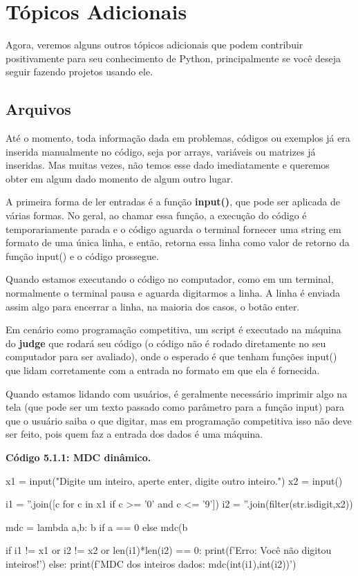 \documentclass[11pt, a4paper]{article}
\begin{document}
\newpage

\section{Tópicos Adicionais}

Agora, veremos alguns outros tópicos adicionais que podem contribuir positivamente para seu conhecimento de Python, principalmente se você deseja seguir fazendo projetos usando ele.

\subsection{Arquivos}

Até o momento, toda informação dada em problemas, códigos ou exemplos já era inserida manualmente no código, seja por arrays, variáveis ou matrizes já inseridas. Mas muitas vezes, não temos esse dado imediatamente e queremos obter em algum dado momento de algum outro lugar.

A primeira forma de ler entradas é a função \textbf{input()}, que pode ser aplicada de várias formas. No geral, ao chamar essa função, a execução do código é temporariamente parada e o código aguarda o terminal fornecer uma string em formato de uma única linha, e então, retorna essa linha como valor de retorno da função input() e o código prossegue.

Quando estamos executando o código no computador, como em um terminal, normalmente o terminal pausa e aguarda digitarmos a linha. A linha é enviada assim algo para encerrar a linha, na maioria dos casos, o botão enter.

Em cenário como programação competitiva, um script é executado na máquina do \textbf{judge} que rodará seu código (o código não é rodado diretamente no seu computador para ser avaliado), onde o esperado é que tenham funções input() que lidam corretamente com a entrada no formato em que ela é fornecida. 

Quando estamos lidando com usuários, é geralmente necessário imprimir algo na tela (que pode ser um texto passado como parâmetro para a função input) para que o usuário saiba o que digitar, mas em programação competitiva isso não deve ser feito, pois quem faz a entrada dos dados é uma máquina.

\textbf{Código 5.1.1: MDC dinâmico.}

\begin{code}
x1 = input("Digite um inteiro, aperte enter, digite outro inteiro.\n")
x2 = input()

i1 = ''.join([c for c in x1 if c >= '0' and c <= '9'])
i2 = ''.join(filter(str.isdigit,x2))

mdc = lambda a,b: b if a == 0 else mdc(b%

if i1 != x1 or i2 != x2 or len(i1)*len(i2) == 0:
    print(f'Erro: Você não digitou inteiros!')
else:
    print(f'MDC dos inteiros dados: {mdc(int(i1),int(i2))}')
\end{code}
\end{document}
